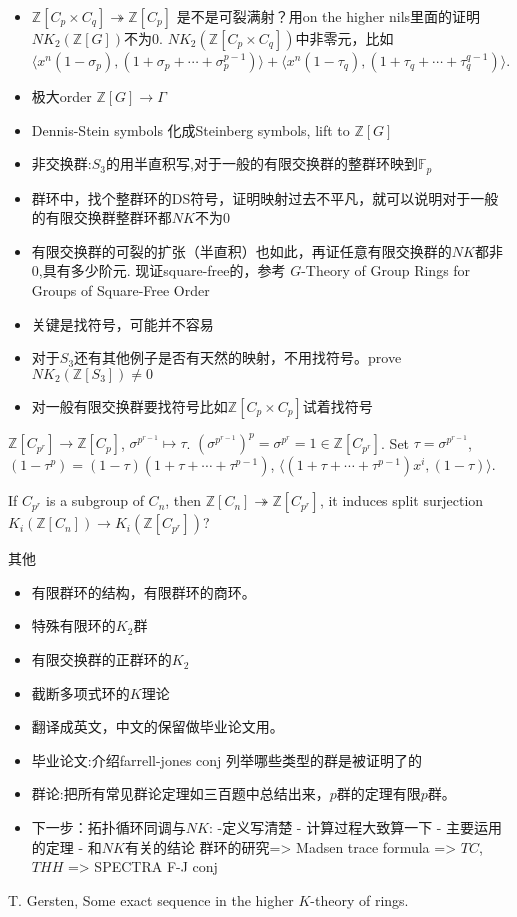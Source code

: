 \begin{itemize}
	\item $\mathbb{Z}[C_p\times C_q] \twoheadrightarrow \mathbb{Z}[C_p]$ 是不是可裂满射？用on the higher nils里面的证明$NK_2(\mathbb{Z}[G])$不为0. $NK_2(\mathbb{Z}[C_p\times C_q])$中非零元，比如$\langle x^n(1-\sigma_p),(1+\sigma_p+\cdots+\sigma_p^{p-1})\rangle + \langle x^n(1-\tau_q),(1+\tau_q+\cdots+\tau_q^{q-1})\rangle$.
	\item 极大order $\mathbb{Z}[G]\longrightarrow \Gamma$
	\item Dennis-Stein symbols 化成Steinberg symbols, lift to $\mathbb{Z}[G]$
	\item 非交换群:$S_3$的用半直积写,对于一般的有限交换群的整群环映到$\mathbb{F}_p$
	\item 群环中，找个整群环的DS符号，证明映射过去不平凡，就可以说明对于一般的有限交换群整群环都$NK$不为$0$
	\item 有限交换群的可裂的扩张（半直积）也如此，再证任意有限交换群的$NK$都非0,具有多少阶元. 现证square-free的，参考 $G$-Theory of Group Rings for Groups of Square-Free Order
	\item 关键是找符号，可能并不容易
	\item 对于$S_3$还有其他例子是否有天然的映射，不用找符号。prove $NK_2(\mathbb{Z}[S_3])\neq 0$
	\item 对一般有限交换群要找符号比如$\mathbb{Z}[C_p \times C_p]$试着找符号
\end{itemize}
$\mathbb{Z}[C_{p^r}] \longrightarrow \mathbb{Z}[C_p]$, $\sigma^{p^{r-1}}\mapsto \tau$. $(\sigma^{p^{r-1}})^p=\sigma^{p^{r}}=1\in \mathbb{Z}[C_{p^r}]$. Set $\tau=\sigma^{p^{r-1}}$, $(1-\tau^p)=(1-\tau)(1+\tau+\cdots+\tau^{p-1})$, $\langle(1+\tau+\cdots+\tau^{p-1})x^i,(1-\tau) \rangle$.

If $C_{p^r}$ is a subgroup of $C_n$, then $\mathbb{Z}[C_n]\twoheadrightarrow \mathbb{Z}[C_{p^r}]$, it induces split surjection $K_i(\mathbb{Z}[C_n])\longrightarrow K_i(\mathbb{Z}[C_{p^r}])$?



其他
\begin{itemize}
	\item 有限群环的结构，有限群环的商环。
	\item 特殊有限环的$K_2$群
	\item 有限交换群的正群环的$K_2$
	\item 截断多项式环的$K$理论
	\item 翻译成英文，中文的保留做毕业论文用。
	\item 毕业论文:介绍farrell-jones conj 列举哪些类型的群是被证明了的
	\item 群论:把所有常见群论定理如三百题中总结出来，$p$群的定理有限$p$群。
	\item 下一步：拓扑循环同调与$NK$:
    -定义写清楚
	- 计算过程大致算一下
	- 主要运用的定理
	- 和$NK$有关的结论
    群环的研究=> Madsen trace formula => $TC$, $THH$ => SPECTRA F-J conj
\end{itemize}
T. Gersten, Some exact sequence in the higher $K$-theory of rings.

